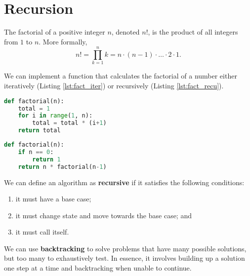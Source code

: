 \chapter{Recursion}

\begin{definition}
    The factorial of a positive integer $n$, denoted $n!$, is the product of all integers from $1$ to $n$. More formally, \[ n! = \prod^{n}_{k = 1} k = n \cdot (n - 1) \cdot \ldots \cdot 2 \cdot 1. \]
\end{definition}

We can implement a function that calculates the factorial of a number either iteratively (Listing \ref{lst:fact_iter}) or recursively (Listing \ref{lst:fact_recu}).

\begin{lstlisting}[float,
                   language = Python,
                   caption = {A function which calculates the factorial using an iterative method in Python.},
                   label = {lst:fact_iter}]
def factorial(n):
    total = 1
    for i in range(1, n):
        total = total * (i+1)
    return total
\end{lstlisting}

\begin{lstlisting}[float,
                   language = Python,
                   caption = {A function which calculates the factorial using a recursive method in Python.},
                   label = {lst:fact_recu}]
def factorial(n):
    if n == 0:
        return 1
    return n * factorial(n-1)
\end{lstlisting}

\begin{definition}
    We can define an algorithm as \textbf{recursive} if it satisfies the following conditions:
    \begin{enumerate}
        \item it must have a base case;
        \item it must change state and move towards the base case; and
        \item it must call itself.
    \end{enumerate}
\end{definition}

\begin{definition}
    We can use \textbf{backtracking} to solve problems that have many possible solutions, but too many to exhaustively test. In essence, it involves building up a solution one step at a time and backtracking when unable to continue.
\end{definition}

